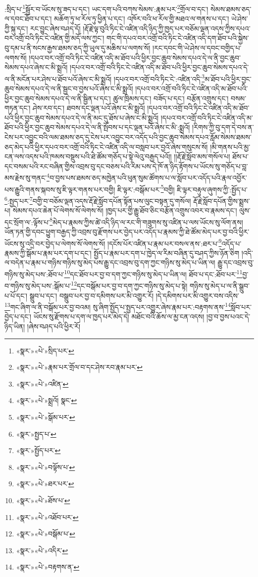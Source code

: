 :སྲིད་པ་\footnote{«སྣར་»«པེ་»སྲིད་པར་}སྦྱོར་བ་ཡོངས་སུ་ཟད་པ་དང་། ཡང་དག་པའི་བཀས་སེམས་:རྣམ་པར་\footnote{«སྣར་»«པེ་»རྣམ་པར་གྲོལ་བ་དང་ཤེས་རབ་རྣམ་པར་}གྲོལ་བ་དང་། སེམས་ཐམས་ཅད་ལ་དབང་ཐོབ་པ་དང་། མཆོག་ཏུ་ཕ་རོལ་ཏུ་ཕྱིན་པ་དང་། འཁོར་བའི་ཕ་རོལ་གྱི་མཐའ་ལ་གནས་པ་དང་། ཡེ་ཤེས་ཀྱི་སྐུ་དང་། རང་བྱུང་ཞེས་བཤད་དོ། །རྡོ་རྗེ་ལྟ་བུའི་ཏིང་ངེ་འཛིན་འདི་ཉིད་ཀྱི་ཁྱད་པར་བཅོམ་ལྡན་འདས་ཀྱིས་དཔའ་བར་འགྲོ་བའི་ཏིང་ངེ་འཛིན་གྱི་མདོ་ལས་ཀྱང་། གང་གི་དཔའ་བར་འགྲོ་བའི་ཏིང་ངེ་འཛིན་འདི་དག་ཐོབ་པའི་སྐྱེས་བུ་དམ་པ་ནི་སངས་རྒྱས་ཐམས་ཅད་ཀྱི་ཡུལ་དུ་མཆིས་པ་ལགས་སོ། །རང་དབང་གི་ཡེ་ཤེས་ལ་དབང་བགྱིད་པ་ལགས་སོ། །དཔའ་བར་འགྲོ་བའི་ཏིང་ངེ་འཛིན་འདི་མ་ཐོབ་པའི་ཕྱིར་བྱང་ཆུབ་སེམས་དཔའ་དེ་ལ་ནི་བྱང་ཆུབ་སེམས་དཔའ་ཞེས་ང་མི་སྨྲའོ། །དཔའ་བར་འགྲོ་བའི་ཏིང་ངེ་འཛིན་འདི་མ་ཐོབ་པའི་ཕྱིར་བྱང་ཆུབ་སེམས་དཔའ་དེ་ལ་ནི་མངོན་པར་ཤེས་པ་ཐོབ་པའོ་ཞེས་ང་མི་སྨྲའོ། །དཔའ་བར་འགྲོ་བའི་ཏིང་ངེ་:འཛིན་འདི་\footnote{«སྣར་»«པེ་»འཛིན་}མ་ཐོབ་པའི་ཕྱིར་བྱང་ཆུབ་སེམས་དཔའ་དེ་ལ་ནི་སྦྱང་བ་བྱས་པའོ་ཞེས་ང་མི་སྨྲའོ། །དཔའ་བར་འགྲོ་བའི་ཏིང་ངེ་འཛིན་འདི་མ་ཐོབ་པའི་ཕྱིར་བྱང་ཆུབ་སེམས་དཔའ་དེ་ལ་ནི་སྦྱིན་པ་དང་། ཚུལ་ཁྲིམས་དང་། བཟོད་པ་དང་། བརྩོན་འགྲུས་དང་། བསམ་གཏན་དང་། ཤེས་རབ་དང་། ཐབས་དང་ལྡན་པའོ་ཞེས་ང་མི་སྨྲའོ། །དཔའ་བར་འགྲོ་བའི་ཏིང་ངེ་འཛིན་འདི་མ་ཐོབ་པའི་ཕྱིར་བྱང་ཆུབ་སེམས་དཔའ་དེ་ལ་ནི་མང་དུ་ཐོས་པ་ཞེས་ང་མི་སྨྲའོ། །དཔའ་བར་འགྲོ་བའི་ཏིང་ངེ་འཛིན་འདི་མ་ཐོབ་པའི་ཕྱིར་བྱང་ཆུབ་སེམས་དཔའ་དེ་ལ་ནི་སྤོབས་པ་དང་ལྡན་པའོ་ཞེས་ང་མི་:སྨྲའོ། །རིགས་ཀྱི་བུ་དག་དེ་བས་ན་ངེས་པར་འབྱུང་བའི་ལམ་ཐམས་ཅད་དུ་ངེས་པར་འབྱུང་བར་འདོད་པའི་བྱང་ཆུབ་སེམས་དཔའ་རློམ་སེམས་ཐམས་ཅད་མེད་པའི་ཕྱིར་དཔའ་བར་འགྲོ་བའི་ཏིང་ངེ་འཛིན་འདི་ལ་བསླབ་པར་བྱའོ་ཞེས་གསུངས་སོ། །མི་གནས་པའི་མྱ་ངན་ལས་འདས་པའི་ཁམས་བསྡུས་པའི་ཐེ་ཚོམ་གཅོད་པ་སྟེ་ལེའུ་བརྒྱད་པའོ།། །།རྡོ་རྗེ་སློབ་མས་གསོལ་པ། ཐོས་པ་དང་བསམ་པའི་རང་བཞིན་གྱིས་འབྲས་བུ་དང་བཅས་པའི་རིམ་པས་དེ་ཁོ་ན་ཉིད་རྟོགས་པ་ཡོངས་སུ་གཅོད་པ་བླ་མས་རྗེས་སུ་གནང་\footnote{«སྣར་»«པེ་»སྨྲའོ། སྣང་}བ་བྱས་པས་ཐམས་ཅད་མཁྱེན་པའི་ཕུན་སུམ་ཚོགས་པ་ལ་སློབ་པར་འདོད་པའི་རྣལ་འབྱོར་པས་རྒྱུའི་གནས་སྐབས་སུ་ཇི་ལྟར་གནས་པར་བགྱི། ཇི་ལྟར་:བསྒོམ་པར་\footnote{«སྣར་»«པེ་»སྒོམ་པར་}བགྱི། ཇི་ལྟར་བརྟུལ་ཞུགས་ཀྱི་:སྤྱོད་པ་\footnote{«སྣར་»སྤྱད་པ་}:སྤྱད་པར་\footnote{«སྣར་»སྤྱོད་པར་}བགྱི་བ་བཅོམ་ལྡན་འདས་རྡོ་རྗེ་སློབ་དཔོན་སྟོན་པས་ལུང་བསྟན་དུ་གསོལ། རྡོ་རྗེ་སློབ་དཔོན་གྱིས་སྨྲས་པ། སེམས་དཔའ་ཆེན་པོ་ལེགས་སོ་ལེགས་སོ། །ཁྱད་པར་གྱི་རྒྱུ་ཐོབ་ཅིང་བརྩོན་འགྲུས་འབར་བ་རྣམས་དང་། ལུས་དང་སྲོག་ལ་:ལྟོས་པ་\footnote{«སྣར་»«པེ་»བལྟོས་པ་}མེད་པ་རྣམས་ཀྱིས་ཚེ་འདི་ཉིད་ལ་རང་གི་གཟུགས་སུ་འཛིན་པ་ལས་ཡོངས་སུ་ལོག་ནས། ཡོན་ཏན་གྱི་དབང་ཕྱུག་བརྒྱད་ཀྱི་འབྲས་བུ་རྫོགས་པར་བྱེད་པར་འདོད་པ་རྣམས་ཀྱི་ཐེ་ཚོམ་མེད་པར་བྱ་བའི་ཕྱིར་ཡོངས་སུ་འདྲི་བར་བྱེད་པ་ལེགས་སོ་ལེགས་སོ། །དངོས་པོར་འཛིན་པ་རྣམ་པར་བསལ་ནས་:ཐར་པ་\footnote{«སྣར་»«པེ་»ཐར་པར་}འདོད་པ་རྣམས་ཀྱི་སྒོམ་པ་རྣམ་པར་དག་པ་དང་། སྤྱོད་པ་རྣམ་པར་དག་པ་ཁྱེད་ལ་རིམ་བཞིན་དུ་བཤད་ཀྱིས་ཉོན་ཅིག །འདི་ལ་བདེན་པ་རྣམ་པ་གཉིས་གཉིས་སུ་མེད་པས་རྒྱུ་དང་འབྲས་བུ་དག་ཀྱང་གཉིས་སུ་མེད་པ་ཡིན་ལ། རྒྱུ་དང་འབྲས་བུ་གཉིས་སུ་མེད་པས་:ཐོབ་པ་\footnote{«སྣར་»«པེ་»ཐོས་པ་}དང་ཐོབ་པར་བྱ་བ་དག་ཀྱང་གཉིས་སུ་མེད་པ་ཡིན་ལ། ཐོབ་པ་དང་:ཐོབ་པར་\footnote{«སྣར་»«པེ་»འཐོབ་པར་}བྱ་བ་གཉིས་སུ་མེད་པས་:སྒོམ་པ་\footnote{«སྣར་»«པེ་»བསྒོམ་པ་}དང་བསྒོམ་པར་བྱ་བ་དག་ཀྱང་གཉིས་སུ་མེད་པ་སྟེ། གཉིས་སུ་མེད་པ་ལ་ནི་སྒྲུབ་པ་པོ་དང་། སྒྲུབ་པ་དང་། བསྒྲུབ་པར་བྱ་བ་དམིགས་པར་མི་འགྱུར་རོ། །དེ་དམིགས་པར་མི་འགྱུར་བས་འདིས་\footnote{«སྣར་»«པེ་»འདིར་}གང་ཞིག་ལ་ནི་བསྒོམ་པར་བྱ་བའམ། སུ་ཞིག་སྤྱོད་པ་སྤྱད་པར་འགྱུར་ཞེས་རྣམ་པར་:བརྟགས་ནས་\footnote{«སྣར་»«པེ་»བརྟགས་ན་}སློབ་པར་བྱེད་པ་དང་། ཡོངས་སུ་རྫོགས་པ་དག་ལ་ཁྱད་པར་མེད་དེ། མཐོང་བའི་ཆོས་ལ་མྱ་ངན་འདས། །བྱ་བ་བྱས་པའང་དེ་ཉིད་ཡིན། །ཞེས་བཤད་པའི་ཕྱིར་རོ། 